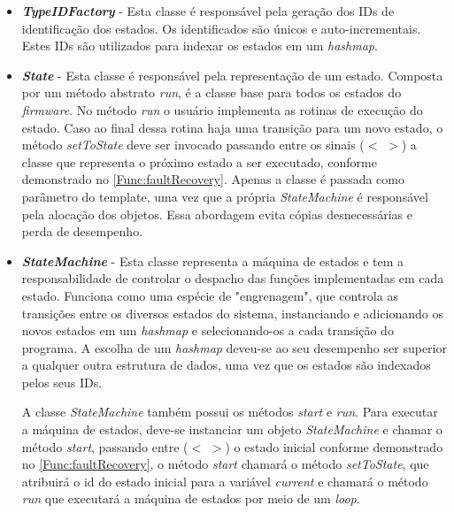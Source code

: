 \begin{itemize}
	\item \textit{\textbf{TypeIDFactory}} - Esta classe é responsável pela geração dos IDs de identificação dos estados. Os identificados são únicos e auto-incrementais. Estes IDs são utilizados para indexar os estados em um \textit{hashmap}.
	
	\item \textit{\textbf{State}} - Esta classe é responsável pela representação de um estado. Composta por um método abstrato \textit{run}, é a classe base para todos os estados do \textit{firmware}. No método \textit{run} o usuário implementa as rotinas de execução do estado. Caso ao final dessa rotina haja uma transição para um novo estado, o método \textit{setToState} deve ser invocado passando entre os sinais ($<$ $>$) a classe que representa o próximo estado a ser executado, conforme demonstrado no \autoref{Func:faultRecovery}. Apenas a classe é passada como parâmetro do template, uma vez que a própria  \textit{StateMachine} é responsável pela alocação dos objetos. Essa abordagem evita cópias desnecessárias e perda de desempenho.
	
	\item \textit{\textbf{StateMachine}} - Esta classe representa a máquina de estados e tem a responsabilidade de controlar o despacho das funções implementadas em cada estado. Funciona como uma espécie de "engrenagem", que controla as transições entre os diversos estados do sistema, instanciando e adicionando os novos estados em um \textit{hashmap} e selecionando-os a cada transição do programa. A escolha de um \textit{hashmap} deveu-se ao seu desempenho ser superior a qualquer outra estrutura de dados, uma vez que os estados são indexados pelos seus IDs.
	
	
	A classe \textit{StateMachine} também possui os métodos \textit{start} e \textit{run}. Para executar a máquina de estados, deve-se instanciar um objeto \textit{StateMachine} e chamar o método \textit{start}, passando entre ($<$ $>$) o estado inicial conforme demonstrado no \autoref{Func:faultRecovery}, o método \textit{start} chamará o método \textit{setToState}, que atribuirá o id do estado inicial para a variável \textit{current} e chamará o método \textit{run} que executará a máquina de estados por meio de um \textit{loop}.
	
\end{itemize}


